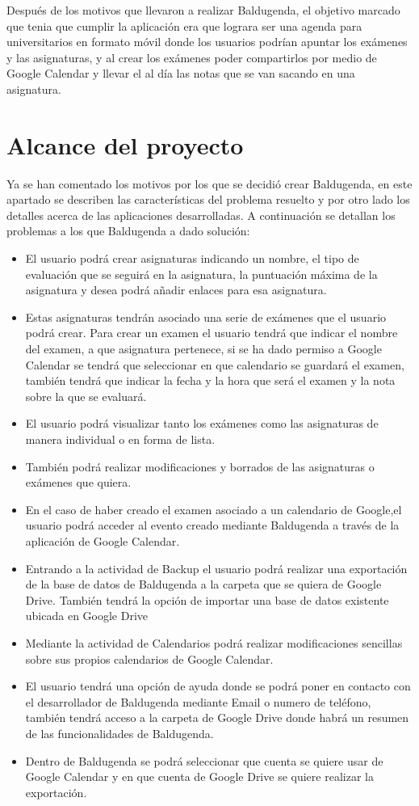 Después de los motivos que llevaron a realizar Baldugenda, el objetivo marcado que tenia que cumplir la aplicación era que lograra ser una agenda para universitarios en formato móvil donde los usuarios podrían apuntar los exámenes y las asignaturas, y al crear los exámenes poder compartirlos por medio de Google Calendar y llevar el al día las notas que se van sacando en una asignatura.  
\newpage
\section{Alcance del proyecto}
\label{secc:Alcance}

Ya se han comentado los motivos por los que se decidió crear Baldugenda, en este apartado se describen las características del problema resuelto y por otro lado los detalles acerca de las aplicaciones desarrolladas.
A continuación se detallan los problemas a los que Baldugenda a dado solución:

\begin{itemize}
	\item El usuario podrá crear asignaturas indicando un nombre, el tipo de evaluación que se seguirá en la asignatura, la puntuación máxima de la asignatura y desea podrá añadir enlaces para esa asignatura.
	\item Estas asignaturas tendrán asociado una serie de exámenes que el usuario podrá crear. Para crear un examen el usuario tendrá que indicar el nombre del examen, a que asignatura pertenece, si se ha dado permiso a Google Calendar se tendrá que seleccionar en que calendario se guardará el examen, también tendrá que indicar la fecha y la hora que será el examen y la nota sobre la que se evaluará.
	\item El usuario podrá visualizar tanto los exámenes como las asignaturas de manera individual o en forma de lista.
	\item También podrá realizar modificaciones y borrados de las asignaturas o exámenes que quiera.
	\item En el caso de haber creado el examen asociado a un calendario de Google,el usuario podrá acceder al evento creado mediante Baldugenda a través de la aplicación de Google Calendar.
	\item Entrando a la actividad de Backup el usuario podrá realizar una exportación de la base de datos de Baldugenda a la carpeta que se quiera de Google Drive. También tendrá la opción de importar una base de datos existente ubicada en Google Drive
	\item Mediante la actividad de Calendarios podrá realizar modificaciones sencillas sobre sus propios calendarios de Google Calendar.
	\item El usuario tendrá una opción de ayuda donde se podrá poner en contacto con el desarrollador de Baldugenda mediante Email o numero de teléfono, también tendrá acceso a la carpeta de Google Drive donde habrá un resumen de las funcionalidades de Baldugenda.
	\item Dentro de Baldugenda se podrá seleccionar que cuenta se quiere usar de Google Calendar y en que cuenta de Google Drive se quiere realizar la exportación.
\end{itemize}


